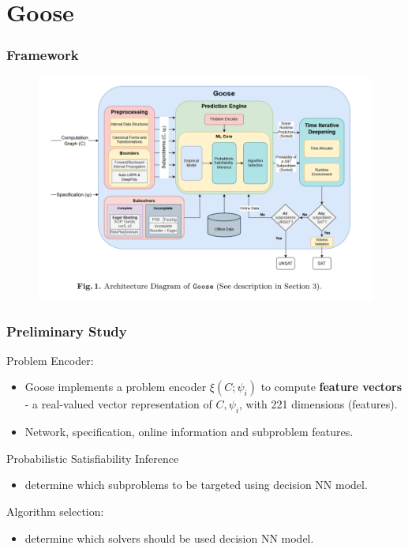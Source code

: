 \documentclass[aspectratio=169%
,serif,mathserif]{beamer}
\begin{document}


\section{Goose}
\begin{frame}
	\frametitle{Framework}
	\begin{figure}[htbp]
		\includegraphics[width=.7\linewidth]{2.png}
	\end{figure}
\end{frame}

\begin{frame}
	\frametitle{Preliminary Study}
	Problem Encoder:
	\begin{itemize}
		\item Goose implements a problem encoder $\xi\left(C ; \psi_i\right)$ to compute \textbf{feature vectors} - a real-valued vector representation of $C, \psi_i$, with 221 dimensions (features).
		\item Network, specification, online information and subproblem features.
	\end{itemize}
	
	Probabilistic Satisfiability Inference
	\begin{itemize}
		\item determine which subproblems to be targeted using decision NN model.
	\end{itemize}

	Algorithm selection:
	\begin{itemize}
		\item determine which solvers should be used decision NN model.
	\end{itemize}
\end{frame}
\end{document}
